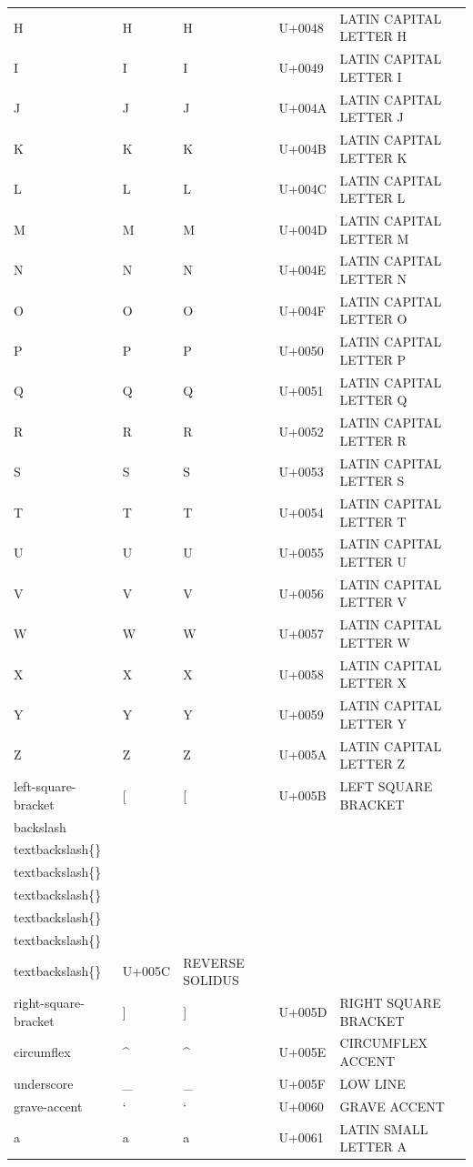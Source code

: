 \documentclass{article}
\begin{document}
\begin{tabular}{lllll}
H & H & H & U+0048 & LATIN CAPITAL LETTER H \\
I & I & I & U+0049 & LATIN CAPITAL LETTER I \\
J & J & J & U+004A & LATIN CAPITAL LETTER J \\
K & K & K & U+004B & LATIN CAPITAL LETTER K \\
L & L & L & U+004C & LATIN CAPITAL LETTER L \\
M & M & M & U+004D & LATIN CAPITAL LETTER M \\
N & N & N & U+004E & LATIN CAPITAL LETTER N \\
O & O & O & U+004F & LATIN CAPITAL LETTER O \\
P & P & P & U+0050 & LATIN CAPITAL LETTER P \\
Q & Q & Q & U+0051 & LATIN CAPITAL LETTER Q \\
R & R & R & U+0052 & LATIN CAPITAL LETTER R \\
S & S & S & U+0053 & LATIN CAPITAL LETTER S \\
T & T & T & U+0054 & LATIN CAPITAL LETTER T \\
U & U & U & U+0055 & LATIN CAPITAL LETTER U \\
V & V & V & U+0056 & LATIN CAPITAL LETTER V \\
W & W & W & U+0057 & LATIN CAPITAL LETTER W \\
X & X & X & U+0058 & LATIN CAPITAL LETTER X \\
Y & Y & Y & U+0059 & LATIN CAPITAL LETTER Y \\
Z & Z & Z & U+005A & LATIN CAPITAL LETTER Z \\
left-square-bracket & [ & [ & U+005B & LEFT SQUARE BRACKET \\
backslash & \\textbackslash\{\}\\textbackslash\{\} & \\textbackslash\{\}\\textbackslash\{\}\\textbackslash\{\}\\textbackslash\{\} & U+005C & REVERSE SOLIDUS \\
right-square-bracket & ] & ] & U+005D & RIGHT SQUARE BRACKET \\
circumflex & \textasciicircum{} & \textasciicircum{} & U+005E & CIRCUMFLEX ACCENT \\
underscore & \_ & \_ & U+005F & LOW LINE \\
grave-accent & ` & ` & U+0060 & GRAVE ACCENT \\
a & a & a & U+0061 & LATIN SMALL LETTER A \\

\end{tabular}
\end{document}
